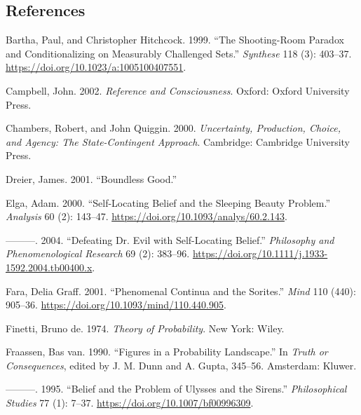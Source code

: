 \documentclass[
  11pt,
  letterpaper,
  DIV=11,
  numbers=noendperiod,
  oneside]{scrartcl}
\newlength{\cslhangindent}
\newenvironment{CSLReferences}[2] %
 {\begin{list}{}{%
  \setlength{\itemindent}{0pt}
  \setlength{\leftmargin}{0pt}
  \setlength{\parsep}{0pt}
  \ifodd #1
   \setlength{\leftmargin}{\cslhangindent}
   \setlength{\itemindent}{-1\cslhangindent}
  \fi
  \setlength{\itemsep}{#2\baselineskip}}}
 {\end{list}}
\begin{document}
\subsection*{References}\label{references}

\label{refs}
\begin{CSLReferences}{1}{0}
Bartha, Paul, and Christopher Hitchcock. 1999. {``The Shooting-Room
Paradox and Conditionalizing on Measurably Challenged Sets.''}
\emph{Synthese} 118 (3): 403--37.
\url{https://doi.org/10.1023/a:1005100407551}.

Campbell, John. 2002. \emph{Reference and Consciousness}. Oxford: Oxford
University Press.

Chambers, Robert, and John Quiggin. 2000. \emph{Uncertainty, Production,
Choice, and Agency: The State-Contingent Approach}. Cambridge: Cambridge
University Press.

Dreier, James. 2001. {``Boundless Good.''}

Elga, Adam. 2000. {``Self-Locating Belief and the Sleeping Beauty
Problem.''} \emph{Analysis} 60 (2): 143--47.
\url{https://doi.org/10.1093/analys/60.2.143}.

---------. 2004. {``Defeating Dr. Evil with Self-Locating Belief.''}
\emph{Philosophy and Phenomenological Research} 69 (2): 383--96.
\url{https://doi.org/10.1111/j.1933-1592.2004.tb00400.x}.

Fara, Delia Graff. 2001. {``Phenomenal Continua and the Sorites.''}
\emph{Mind} 110 (440): 905--36.
\url{https://doi.org/10.1093/mind/110.440.905}.

Finetti, Bruno de. 1974. \emph{Theory of Probability}. New York: Wiley.

Fraassen, Bas van. 1990. {``Figures in a Probability Landscape.''} In
\emph{Truth or Consequences}, edited by J. M. Dunn and A. Gupta,
345--56. Amsterdam: Kluwer.

---------. 1995. {``Belief and the Problem of Ulysses and the Sirens.''}
\emph{Philosophical Studies} 77 (1): 7--37.
\url{https://doi.org/10.1007/bf00996309}.


\end{CSLReferences}
\end{document}
